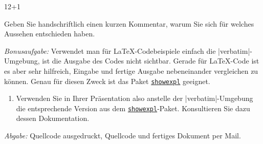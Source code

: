 \documentclass{scrartcl}
\newcommand{\abgabe}[1]{\par\noindent\textit{Abgabe:} #1}
\newcommand{\pkg}[1]{\href{http://ctan.org/pkg/#1}{\texttt{#1}}}
\begin{document}
\begin{question}[subtitle=Präsentation mit beamer]{12+1}
\begin{enumerate}[label=\alph*)]
Geben Sie handschriftlich einen kurzen Kommentar, warum Sie sich für welches Aussehen entschieden haben.
\end{enumerate}
\emph{Bonusaufgabe:}
Verwendet man für \LaTeX-Codebeispiele einfach die |verbatim|-Umgebung, ist die Ausgabe des Codes nicht sichtbar. Gerade für \LaTeX-Code ist es aber sehr hilfreich, Eingabe und fertige Ausgabe nebeneinander vergleichen zu können. Genau für diesen Zweck ist das Paket \pkg{showexpl} geeignet.
\begin{enumerate}[label=\alph*), resume]
	\item Verwenden Sie in Ihrer Präsentation also anstelle der |verbatim|-Umgebung die entsprechende Version aus dem \pkg{showexpl}-Paket. Konsultieren Sie dazu dessen Dokumentation.
\end{enumerate}
	\abgabe{Quellcode ausgedruckt, Quellcode und fertiges Dokument per Mail.}
\end{question}
\end{document}
